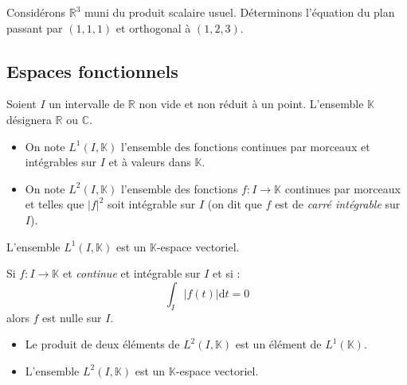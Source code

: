 \documentclass[french,11pt,twoside]{VcCours}
\newcommand{\dt}{\text{d}t}
\begin{document}
\begin{Exemple}{} Considérons $\mathbb{R}^3$ muni du produit scalaire usuel. Déterminons l'équation du plan passant par $(1,1,1)$ et orthogonal à $(1,2,3)$.

\vspace{3cm}
\end{Exemple}

\subsection{Espaces fonctionnels}
Soient $I$ un intervalle de $\mathbb{R}$ non vide et non réduit à un point. L'ensemble $\mathbb{K}$ désignera $\mathbb{R}$ ou $\mathbb{C}$.

\begin{Definition}{} 
\begin{itemize}
\item On note $L^1(I, \mathbb{K})$ l'ensemble des fonctions continues par morceaux et intégrables sur $I$ et à valeurs dans $\mathbb{K}$.
\item On note $L^2(I, \mathbb{K})$ l'ensemble des fonctions $f : I \rightarrow \mathbb{K}$ continues par morceaux et telles que $\vert f \vert^2$ soit intégrable sur $I$ (on dit que $f$ est de \emph{carré intégrable} sur $I$).
\end{itemize}
\end{Definition}

\begin{Proposition}{} L'ensemble $L^1(I, \mathbb{K})$ est un $\mathbb{K}$-espace vectoriel.
\end{Proposition}

\begin{Demonstration}{} 

\vspace{6.5cm}
\end{Demonstration}

\begin{Remarque}{} Si $f : I \rightarrow \mathbb{K}$ et \emph{continue} et intégrable sur $I$ et si :
$$ \int_{I} \vert f(t) \vert \dt =0$$
alors $f$ est nulle sur $I$.
\end{Remarque}

\begin{Proposition}{} 
\begin{itemize}
\item Le produit de deux éléments de $L^2(I, \mathbb{K})$ est un élément de $L^1(\mathbb{K})$.
\item L'ensemble $L^2(I, \mathbb{K})$ est un $\mathbb{K}$-espace vectoriel.
\end{itemize}
 \end{Proposition}
 
\end{document}
